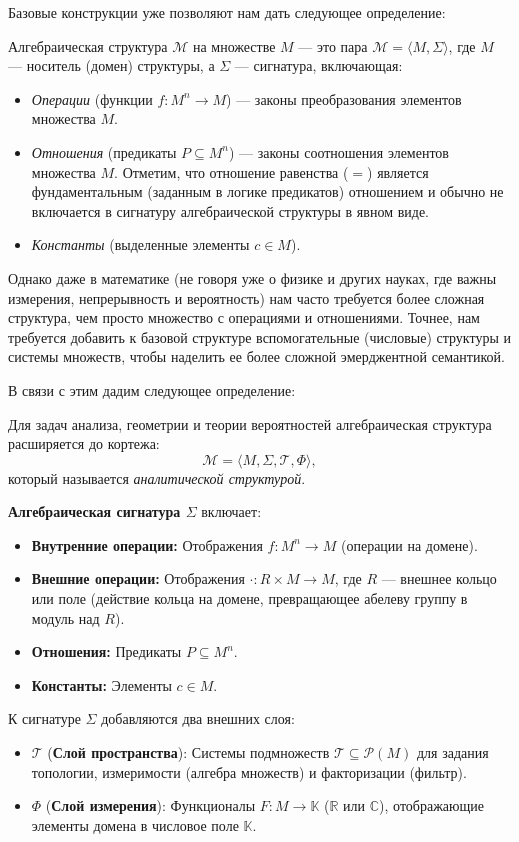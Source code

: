 \documentclass[11pt, a4paper]{extarticle}
\newcommand{\Pcal}{{\mathcal P}}
\newcommand{\Mcal}{{\mathcal M}}
\newcommand{\R}{{\mathbb R}}
\newcommand{\C}{{\mathbb C}}
\begin{document}
Базовые конструкции уже позволяют нам дать следующее определение:
\begin{definition}
Алгебраическая структура $\Mcal$ на множестве $M$ --- это пара $\Mcal = \langle M, \Sigma \rangle$, где $M$ — носитель (домен) структуры, а $\Sigma$ — сигнатура, включающая:
\begin{itemize}
    \item \textit{Операции} (функции $f: M^n \to M$) — законы преобразования элементов множества $M$.
    \item \textit{Отношения} (предикаты $P \subseteq M^n$) — законы соотношения элементов множества $M$. Отметим, что отношение равенства ($=$) является фундаментальным (заданным в логике предикатов) отношением и обычно не включается в сигнатуру алгебраической структуры в явном виде.
    \item \textit{Константы} (выделенные элементы $c \in M$).
\end{itemize}
\end{definition}

Однако даже в математике (не говоря уже о физике и других науках, где важны измерения, непрерывность и вероятность) нам часто требуется более сложная структура, чем просто множество с операциями и отношениями. Точнее, нам требуется добавить к базовой структуре вспомогательные (числовые) структуры и системы множеств, чтобы наделить ее более сложной эмерджентной семантикой.

В связи с этим дадим следующее определение:
\begin{definition}
Для задач анализа, геометрии и теории вероятностей алгебраическая структура расширяется до кортежа:
$$ \Mcal = \langle M, \Sigma, \mathcal{T}, \Phi \rangle, $$
который называется \textit{аналитической структурой}. 

\textbf{Алгебраическая сигнатура $\Sigma$} включает:
\begin{itemize}
    \item \textbf{Внутренние операции:} Отображения $f: M^n \to M$ (операции на домене).
    \item \textbf{Внешние операции:} Отображения $\cdot: R \times M \to M$, где $R$ — внешнее кольцо или поле (действие кольца на домене, превращающее абелеву группу в модуль над $R$).
    \item \textbf{Отношения:} Предикаты $P \subseteq M^n$.
    \item \textbf{Константы:} Элементы $c \in M$.
\end{itemize}

К сигнатуре $\Sigma$ добавляются два внешних слоя:
\begin{itemize}
    \item $\mathcal{T}$ (\textbf{Слой пространства}): Системы подмножеств $\mathcal{T} \subseteq \Pcal(M)$ для задания топологии, измеримости (алгебра множеств) и факторизации (фильтр).
    \item $\Phi$ (\textbf{Слой измерения}): Функционалы $F: M \to \mathbb{K}$ ($\R$ или $\C$), отображающие элементы домена в числовое поле $\mathbb{K}$.
\end{itemize}
\end{definition}
\end{document}
